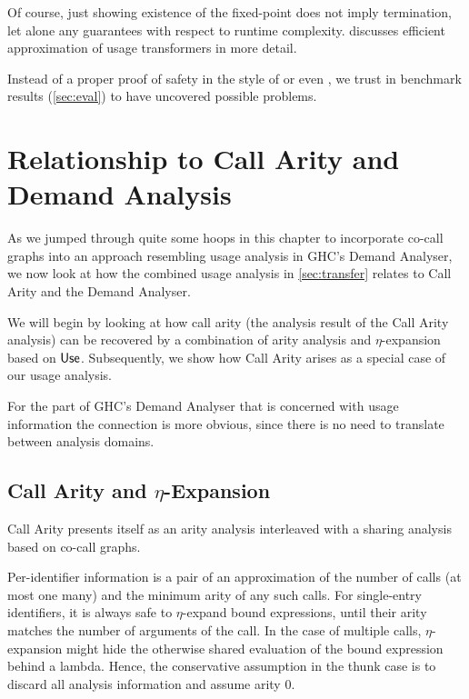 Of course, just showing existence of the fixed-point does not imply termination, let alone any guarantees with respect to runtime complexity. 
 discusses efficient approximation of usage transformers in more detail.

Instead of a proper proof of safety in the style of \textcite{card} or even \textcite{callarity}, we trust in benchmark results (\cf \cref{sec:eval}) to have uncovered possible problems.

\section{Relationship to Call Arity and Demand Analysis}\label{sec:generalise}

As we jumped through quite some hoops in this chapter to incorporate co-call graphs into an approach resembling usage analysis in GHC's Demand Analyser, we now look at how the combined usage analysis in \cref{sec:transfer} relates to Call Arity and the Demand Analyser.

We will begin by looking at how call arity (the analysis result of the Call Arity analysis) can be recovered by a combination of arity analysis and $\eta$-expansion based on $\text{\textsf{Use}}$. 
Subsequently, we show how Call Arity arises as a special case of our usage analysis.

For the part of GHC's Demand Analyser that is concerned with usage information \parencite{card} the connection is more obvious, since there is no need to translate between analysis domains.

\subsection{Call Arity and $\eta$-Expansion}\label{sec:expand}

Call Arity \parencite{callarity} presents itself as an arity analysis interleaved with a sharing analysis based on co-call graphs. 

Per-identifier information is a pair of an approximation of the number of calls (\eg at most one \vs many) and the minimum arity of any such calls.
For single-entry identifiers, it is always safe to $\eta$-expand bound expressions, until their arity matches the number of arguments of the call.
In the case of multiple calls, $\eta$-expansion might hide the otherwise shared evaluation of the bound expression behind a lambda.
Hence, the conservative assumption in the thunk case is to discard all analysis information and assume arity 0.

